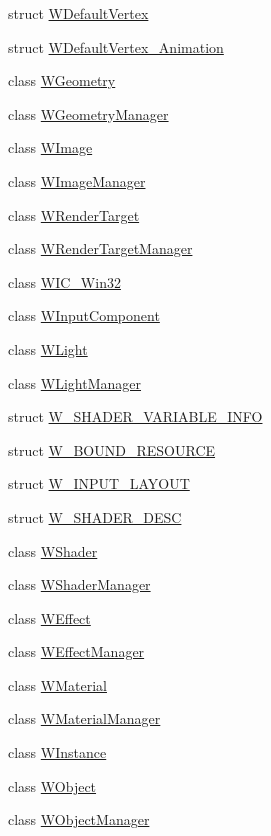 \begin{DoxyCompactItemize}
struct \hyperlink{struct_w_default_vertex}{W\+Default\+Vertex}
\item 
struct \hyperlink{struct_w_default_vertex___animation}{W\+Default\+Vertex\+\_\+\+Animation}
\item 
class \hyperlink{class_w_geometry}{W\+Geometry}
\item 
class \hyperlink{class_w_geometry_manager}{W\+Geometry\+Manager}
\item 
class \hyperlink{class_w_image}{W\+Image}
\item 
class \hyperlink{class_w_image_manager}{W\+Image\+Manager}
\item 
class \hyperlink{class_w_render_target}{W\+Render\+Target}
\item 
class \hyperlink{class_w_render_target_manager}{W\+Render\+Target\+Manager}
\item 
class \hyperlink{class_w_i_c___win32}{W\+I\+C\+\_\+\+Win32}
\item 
class \hyperlink{class_w_input_component}{W\+Input\+Component}
\item 
class \hyperlink{class_w_light}{W\+Light}
\item 
class \hyperlink{class_w_light_manager}{W\+Light\+Manager}
\item 
struct \hyperlink{struct_w___s_h_a_d_e_r___v_a_r_i_a_b_l_e___i_n_f_o}{W\+\_\+\+S\+H\+A\+D\+E\+R\+\_\+\+V\+A\+R\+I\+A\+B\+L\+E\+\_\+\+I\+N\+FO}
\item 
struct \hyperlink{struct_w___b_o_u_n_d___r_e_s_o_u_r_c_e}{W\+\_\+\+B\+O\+U\+N\+D\+\_\+\+R\+E\+S\+O\+U\+R\+CE}
\item 
struct \hyperlink{struct_w___i_n_p_u_t___l_a_y_o_u_t}{W\+\_\+\+I\+N\+P\+U\+T\+\_\+\+L\+A\+Y\+O\+UT}
\item 
struct \hyperlink{struct_w___s_h_a_d_e_r___d_e_s_c}{W\+\_\+\+S\+H\+A\+D\+E\+R\+\_\+\+D\+E\+SC}
\item 
class \hyperlink{class_w_shader}{W\+Shader}
\item 
class \hyperlink{class_w_shader_manager}{W\+Shader\+Manager}
\item 
class \hyperlink{class_w_effect}{W\+Effect}
\item 
class \hyperlink{class_w_effect_manager}{W\+Effect\+Manager}
\item 
class \hyperlink{class_w_material}{W\+Material}
\item 
class \hyperlink{class_w_material_manager}{W\+Material\+Manager}
\item 
class \hyperlink{class_w_instance}{W\+Instance}
\item 
class \hyperlink{class_w_object}{W\+Object}
\item 
class \hyperlink{class_w_object_manager}{W\+Object\+Manager}
\end{DoxyCompactItemize}
